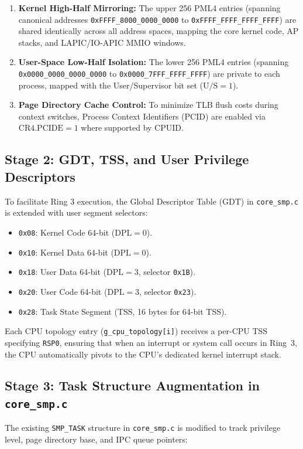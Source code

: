 \documentclass[10pt,journal,compsoc,twocolumn]{article}
\begin{document}
\begin{enumerate}[leftmargin=*]
    \item \textbf{Kernel High-Half Mirroring:} The upper 256 PML4 entries (spanning canonical addresses \texttt{0xFFFF\_8000\_0000\_0000} to \texttt{0xFFFF\_FFFF\_FFFF\_FFFF}) are shared identically across all address spaces, mapping the core kernel code, AP stacks, and LAPIC/IO-APIC MMIO windows.
    \item \textbf{User-Space Low-Half Isolation:} The lower 256 PML4 entries (spanning \texttt{0x0000\_0000\_0000\_0000} to \texttt{0x0000\_7FFF\_FFFF\_FFFF}) are private to each process, mapped with the User/Supervisor bit set ($\text{U/S} = 1$).
    \item \textbf{Page Directory Cache Control:} To minimize TLB flush costs during context switches, Process Context Identifiers (PCID) are enabled via $\text{CR4.PCIDE} = 1$ where supported by CPUID.
\end{enumerate}

\subsection{Stage 2: GDT, TSS, and User Privilege Descriptors}
To facilitate Ring 3 execution, the Global Descriptor Table (GDT) in \texttt{core\_smp.c} is extended with user segment selectors:
\begin{itemize}[leftmargin=*]
    \item \texttt{0x08}: Kernel Code 64-bit ($\text{DPL} = 0$).
    \item \texttt{0x10}: Kernel Data 64-bit ($\text{DPL} = 0$).
    \item \texttt{0x18}: User Data 64-bit ($\text{DPL} = 3$, selector \texttt{0x1B}).
    \item \texttt{0x20}: User Code 64-bit ($\text{DPL} = 3$, selector \texttt{0x23}).
    \item \texttt{0x28}: Task State Segment (TSS, 16 bytes for 64-bit TSS).
\end{itemize}
Each CPU topology entry (\texttt{g\_cpu\_topology[i]}) receives a per-CPU TSS specifying \texttt{RSP0}, ensuring that when an interrupt or system call occurs in Ring~3, the CPU automatically pivots to the CPU's dedicated kernel interrupt stack.

\subsection{Stage 3: Task Structure Augmentation in \texttt{core\_smp.c}}
The existing \texttt{SMP\_TASK} structure in \texttt{core\_smp.c} is modified to track privilege level, page directory base, and IPC queue pointers:
\end{document}
